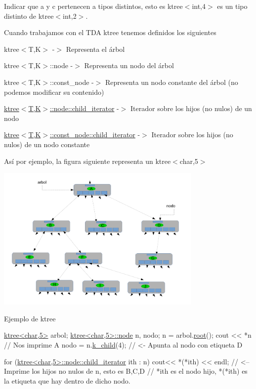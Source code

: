 Indicar que a y c pertenecen a tipos distintos, esto es ktree$<$int,4$>$ es un tipo distinto de ktree$<$int,2$>$.

Cuando trabajamos con el T\+DA ktree tenemos definidos los siguientes \begin{DoxyItemize}
\item ktree$<$\+T,\+K$>$ -\/$>$ Representa el árbol \item ktree$<$\+T,\+K$>$\+::node -\/$>$ Representa un nodo del árbol \item ktree$<$\+T,\+K$>$\+::const\+\_\+node -\/$>$ Representa un nodo constante del árbol (no podemos modificar su contenido) \item \hyperlink{classktree_1_1node_afa2e7c16e38c1a4a062930d167b02a7f}{ktree$<$\+T,\+K$>$\+::node\+::child\+\_\+iterator} -\/$>$ Iterador sobre los hijos (no nulos) de un nodo \item \hyperlink{classktree_1_1const__node_afa2e7c16e38c1a4a062930d167b02a7f}{ktree$<$\+T,\+K$>$\+::const\+\_\+node\+::child\+\_\+iterator} -\/$>$ Iterador sobre los hijos (no nulos) de un nodo constante\end{DoxyItemize}
Así por ejemplo, la figura siguiente representa un ktree$<$char,5$>$

 
\begin{DoxyImage}
\includegraphics[width=10cm]{ktree_ejemplo}
\caption{Ejemplo de ktree}
\end{DoxyImage}



\begin{DoxyCode}
\hyperlink{classktree}{ktree<char,5>} arbol;
\hyperlink{classktree_1_1node}{ktree<char,5>::node} n, nodo;
n = arbol.\hyperlink{classktree_a2d252651d05d9a107c009fcfdfc91df4}{root}();
cout << *n \textcolor{comment}{// Nos imprime A}
nodo = n.\hyperlink{classktree_1_1node_adcb69c2caed252b51d400f4237c1f472}{k\_child}(4); \textcolor{comment}{// <- Apunta al nodo con etiqueta D}

\textcolor{keywordflow}{for} (\hyperlink{classktree_1_1node_1_1child__iterator}{ktree<char,5>::node::child\_iterator} ith : n)
  cout<< *(*ith) << endl; \textcolor{comment}{// <--  Imprime los hijos no nulos de n, esto es B,C,D}
                              \textcolor{comment}{//  *ith es el nodo hijo, *(*ith) es la etiqueta que hay dentro de dicho
       nodo.}
\end{DoxyCode}


